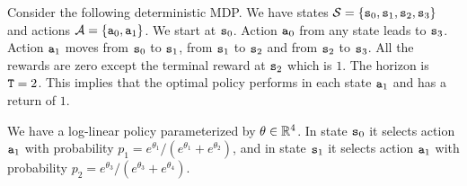 \begin{example}
Consider the following deterministic MDP. We have states
$\mathcal{S}=\{{\tt s}_0,{\tt s}_1,{\tt s}_2,{\tt s}_3\}$ and actions
$\mathcal{A}=\{{\tt a}_0,{\tt a}_1\}$. We start at ${\tt s}_0$. Action
${\tt a}_0$ from any state leads to ${\tt s}_3$. Action ${\tt a}_1$
moves from ${\tt s}_0$ to ${\tt s}_1$, from ${\tt s}_1$ to ${\tt s}_2$ and from ${\tt s}_2$ to ${\tt s}_3$. All the rewards are zero except the terminal reward at
${\tt s}_2$ which is $1$. The horizon is ${\tt T}=2$. This implies
that the optimal policy performs in each state ${\tt a}_1$ and has a
return of $1$.

We have a log-linear policy parameterized by $\theta\in\mathbb{R}^4$. In
state ${\tt s}_0$ it selects action ${\tt a}_1$ with probability
$p_1=e^{\theta_1}/(e^{\theta_1}+e^{\theta_2})$, and in state
${\tt s}_1$ it selects action ${\tt a}_1$ with probability
$p_2=e^{\theta_3}/(e^{\theta_3}+e^{\theta_4})$.


\end{example}
